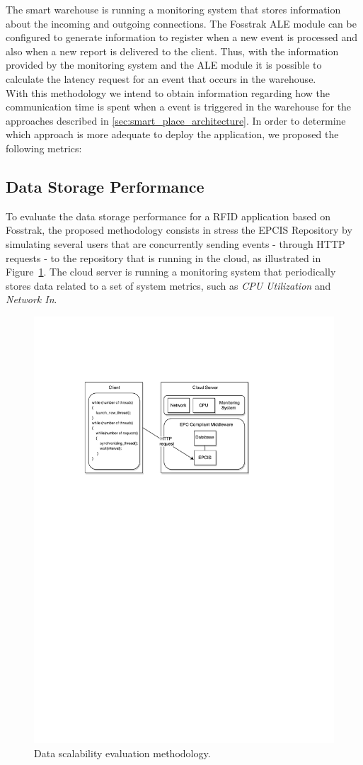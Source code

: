 The smart warehouse is running a monitoring system that stores information about the incoming and outgoing
connections. The Fosstrak \gls{ALE} module can be configured to generate information to register
when a new event is processed and also when a new report is delivered to the client. Thus, with the
information provided by the monitoring system and the \gls{ALE} module it is possible to calculate
the latency request for an event that occurs in the warehouse.\\

With this methodology we intend to obtain information regarding how the communication time is spent
when a event is triggered in the warehouse for the approaches described in \ref{sec:smart_place_architecture}.
In order to determine which approach is more adequate to deploy the application, we proposed the
following metrics:

\subsection{Data Storage Performance}
\label{sub:eval_methodology_data}
To evaluate the data storage performance for a \gls{RFID} application based on Fosstrak, the proposed
methodology consists in stress the \gls{EPCIS} Repository by simulating several users that are
concurrently sending events - through \gls{HTTP} requests - to the repository that is
running in the cloud, as illustrated in Figure~\ref{fig:eval_data_methodology}. The cloud server is
running a monitoring system that periodically stores data related to a set of system metrics,
such as \textit{CPU Utilization} and \textit{Network In}.\\

\begin{figure}[ht!]
  \centering
  \includegraphics[width=.7\textwidth]{./images/eval_data_methodology}
  \caption{Data scalability evaluation methodology.}
  \label{fig:eval_data_methodology}
\end{figure}


